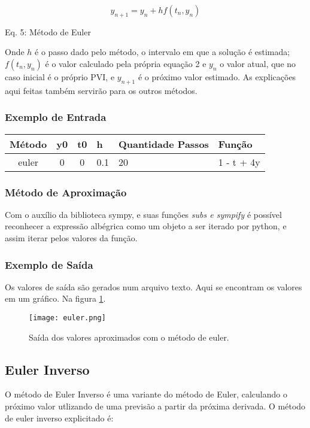 \documentclass[a4paper]{article}
\begin{document}
\begin{equation}
    y_{n+1} = y_n + hf(t_n,y_n)
\end{equation}
    \centerline{Eq. 5: Método de Euler} \smallskip

Onde $h$ é o passo dado pelo método, o intervalo em que a solução é estimada; $f(t_n,y_n)$ é o valor calculado pela própria equação 2 e $y_n$ o valor atual, que no caso inicial é o próprio PVI, e $y_{n+1}$ é o próximo valor estimado. As explicações aqui feitas também servirão para os outros métodos.

\subsubsection{Exemplo de Entrada}
\begin{table}[htb]
    \centering
        \begin{tabular}{|c|c|c|l|l|l|}
        \hline
        Método & y0 & t0 & h   & Quantidade Passos & Função \\ \hline
        euler  & 0  & 0  & 0.1 & 20                &  1 - t + 4y      \\ \hline
    \end{tabular}
\end{table}

\subsubsection{Método de Aproximação}
Com o auxílio da biblioteca sympy, e suas funções \textit{subs e sympify} é possível reconhecer a expressão albégrica como um objeto a ser iterado por python, e assim iterar pelos valores da função.

\subsubsection{Exemplo de Saída}
Os valores de saída são gerados num arquivo texto. Aqui se encontram os valores em um gráfico. Na figura \ref{fig:euler}.
\begin{figure}
\centering
\texttt{[image: euler.png]}
\caption{\label{fig:euler}Saída dos valores aproximados com o método de euler.}
\end{figure}

\newpage
\subsection{Euler Inverso}

O método de Euler Inverso é uma variante do método de Euler, calculando o próximo valor utlizando de uma previsão a partir da próxima derivada. 
O método de euler inverso explicitado é:
\end{document}
